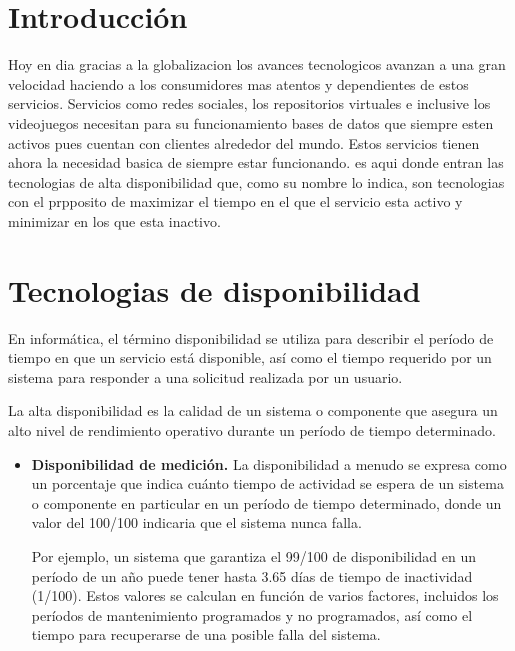 \documentclass{article}
\begin{document}
\begin{multicols}{2}

\section{Introducción}
Hoy en dia gracias a la globalizacion los avances tecnologicos avanzan a una gran velocidad haciendo a los consumidores mas atentos y dependientes de estos servicios. Servicios como redes sociales, los repositorios virtuales e inclusive los videojuegos necesitan para su funcionamiento bases de datos  que siempre esten activos pues cuentan con clientes alrededor del mundo. Estos servicios tienen ahora la necesidad basica de siempre estar funcionando. es aqui donde entran las tecnologias de alta disponibilidad que, como su nombre lo indica, son tecnologias con el prpposito de maximizar el tiempo en el que el servicio esta activo y minimizar en los que esta inactivo.

\section{Tecnologias de disponibilidad}
En informática, el término disponibilidad se utiliza para describir el período de tiempo en que un servicio está disponible, así como el tiempo requerido por un sistema para responder a una solicitud realizada por un usuario.

La alta disponibilidad es la calidad de un sistema o componente que asegura un alto nivel de rendimiento operativo durante un período de tiempo determinado.

\begin{itemize}
\item \textbf{Disponibilidad de medición.}
La disponibilidad a menudo se expresa como un porcentaje que indica cuánto tiempo de actividad se espera de un sistema o componente en particular en un período de tiempo determinado, donde un valor del 100/100 indicaria que el sistema nunca falla.

Por ejemplo, un sistema que garantiza el 99/100 de disponibilidad en un período de un año puede tener hasta 3.65 días de tiempo de inactividad (1/100).
Estos valores se calculan en función de varios factores, incluidos los períodos de mantenimiento programados y no programados, así como el tiempo para recuperarse de una posible falla del sistema.

\end{itemize}





\end{multicols}
\end{document}
